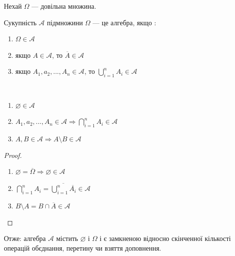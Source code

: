 Нехай $\Omega$ --- довільна множина.

\begin{definition}
    Сукупність $\mathcal{A}$ підмножини $\Omega$ --- це алгебра, якщо :

    \begin{enumerate}
        \item $\Omega \in \mathcal{A}$
        \item якщо $A \in \mathcal{A}$, то $\overline{A} \in \mathcal{A}$
        \item якщо $A_1, a_2, ..., A_n \in \mathcal{A}$, то $\bigcup\limits_{i=1}^{n} A_i \in \mathcal{A}$
    \end{enumerate}    
\end{definition}

\begin{claim}~
    \begin{enumerate}
        \item $\varnothing \in \mathcal{A}$
        \item $A_1, a_2, ..., A_n \in \mathcal{A} \Rightarrow \bigcap\limits_{i=1}^{n} A_i \in \mathcal{A}$
        \item $A, B \in \mathcal{A} \Rightarrow A \setminus B \in \mathcal{A}$
    \end{enumerate}
\end{claim}
\begin{proof}
    \begin{enumerate}
        \item $\varnothing 
        = \overline{\Omega} 
        \Rightarrow \varnothing \in \mathcal{A}$
        
        \item $\bigcap\limits_{i=1}^{n} A_i 
        = \overline{\bigcup\limits_{i=1}^{n} \overline{A_i}} 
        \in \mathcal{A}$

        \item $B \setminus A
        = B \cap \overline{A}
        \in \mathcal{A}$
    \end{enumerate}   
\end{proof}

Отже: алгебра $\mathcal{A}$ містить $\varnothing$ і $\Omega$ і
є замкненою відносно скінченної кількості операцій обєднання,
перетину чи взяття доповнення.

